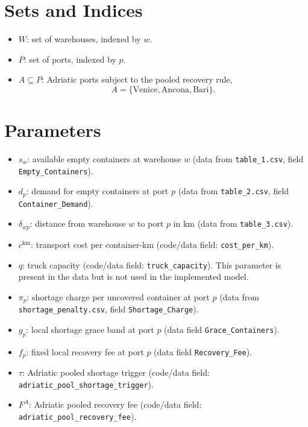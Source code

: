 \section*{Sets and Indices}

\begin{itemize}
    \item $W$: set of warehouses, indexed by $w$.
    \item $P$: set of ports, indexed by $p$.
    \item $A \subseteq P$: Adriatic ports subject to the pooled recovery rule,
    \[
    A=\{\text{Venice},\text{Ancona},\text{Bari}\}.
    \]
\end{itemize}

\section*{Parameters}

\begin{itemize}
    \item $s_w$: available empty containers at warehouse $w$ (data from \texttt{table\_1.csv}, field \texttt{Empty\_Containers}).
    \item $d_p$: demand for empty containers at port $p$ (data from \texttt{table\_2.csv}, field \texttt{Container\_Demand}).
    \item $\delta_{wp}$: distance from warehouse $w$ to port $p$ in km (data from \texttt{table\_3.csv}).
    \item $c^{\mathrm{km}}$: transport cost per container-km (code/data field: \texttt{cost\_per\_km}).
    \item $q$: truck capacity (code/data field: \texttt{truck\_capacity}). This parameter is present in the data but is not used in the implemented model.
    \item $\pi_p$: shortage charge per uncovered container at port $p$ (data from \texttt{shortage\_penalty.csv}, field \texttt{Shortage\_Charge}).
    \item $g_p$: local shortage grace band at port $p$ (data field \texttt{Grace\_Containers}).
    \item $f_p$: fixed local recovery fee at port $p$ (data field \texttt{Recovery\_Fee}).
    \item $\tau$: Adriatic pooled shortage trigger (code/data field: \texttt{adriatic\_pool\_shortage\_trigger}).
    \item $F^A$: Adriatic pooled recovery fee (code/data field: \texttt{adriatic\_pool\_recovery\_fee}).
\end{itemize}

